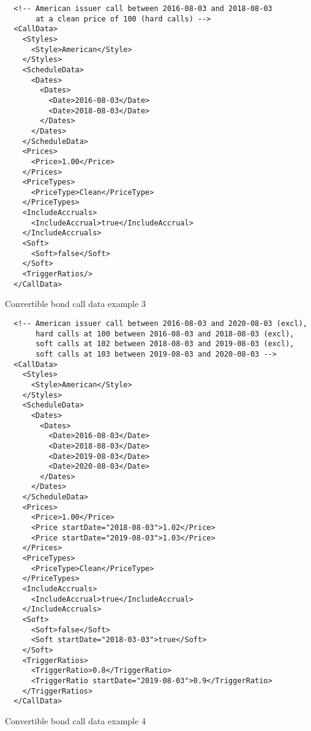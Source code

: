\begin{listing}[H]
\begin{verbatim}
  <!-- American issuer call between 2016-08-03 and 2018-08-03
       at a clean price of 100 (hard calls) -->
  <CallData>
    <Styles>
      <Style>American</Style>
    </Styles>
    <ScheduleData>
      <Dates>
        <Dates>
          <Date>2016-08-03</Date>
          <Date>2018-08-03</Date>
        </Dates>
      </Dates>
    </ScheduleData>
    <Prices>
      <Price>1.00</Price>
    </Prices>
    <PriceTypes>
      <PriceType>Clean</PriceType>
    </PriceTypes>
    <IncludeAccruals>
      <IncludeAccrual>true</IncludeAccrual>
    </IncludeAccruals>
    <Soft>
      <Soft>false</Soft>
    </Soft>
    <TriggerRatios/>
  </CallData>
\end{verbatim}
\caption{Convertible bond call data example 3}
\label{lst:convertiblebonddata_callputdata_3}
\end{listing}

\begin{listing}[H]
\begin{verbatim}
  <!-- American issuer call between 2016-08-03 and 2020-08-03 (excl),
       hard calls at 100 between 2016-08-03 and 2018-08-03 (excl),
       soft calls at 102 between 2018-08-03 and 2019-08-03 (excl),
       soft calls at 103 between 2019-08-03 and 2020-08-03 -->
  <CallData>
    <Styles>
      <Style>American</Style>
    </Styles>
    <ScheduleData>
      <Dates>
        <Dates>
          <Date>2016-08-03</Date>
          <Date>2018-08-03</Date>
          <Date>2019-08-03</Date>
          <Date>2020-08-03</Date>
        </Dates>
      </Dates>
    </ScheduleData>
    <Prices>
      <Price>1.00</Price>
      <Price startDate="2018-08-03">1.02</Price>
      <Price startDate="2019-08-03">1.03</Price>
    </Prices>
    <PriceTypes>
      <PriceType>Clean</PriceType>
    </PriceTypes>
    <IncludeAccruals>
      <IncludeAccrual>true</IncludeAccrual>
    </IncludeAccruals>
    <Soft>
      <Soft>false</Soft>
      <Soft startDate="2018-03-03">true</Soft>
    </Soft>
    <TriggerRatios>
      <TriggerRatio>0.8</TriggerRatio>
      <TriggerRatio startDate="2019-08-03">0.9</TriggerRatio>
    </TriggerRatios>
  </CallData>
\end{verbatim}
\caption{Convertible bond call data example 4}
\label{lst:convertiblebonddata_callputdata_4}
\end{listing}

